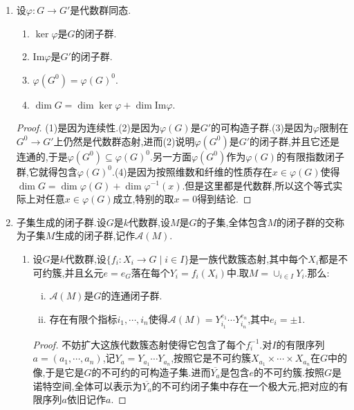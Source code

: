 \begin{enumerate}
\begin{enumerate}[(1)]
\begin{proof}
			从$B\subseteq\mathrm{N}_G(A)$得到$AB$是$G$的子群.并且它作为$A\times B$在$G\times G\to G$下的像,得到$AB$是可构造子集.于是上一条得证.
		\end{proof}
	\end{enumerate}
	\item 设$\varphi:G\to G'$是代数群同态.
	\begin{enumerate}[(1)]
		\item $\ker\varphi$是$G$的闭子群.
		\item $\mathrm{Im}\varphi$是$G'$的闭子群.
		\item $\varphi(G^0)=\varphi(G)^0$.
		\item $\dim G=\dim\ker\varphi+\dim\mathrm{Im}\varphi$.
	\end{enumerate}
    \begin{proof}
    	
    	(1)是因为连续性.(2)是因为$\varphi(G)$是$G'$的可构造子群.(3)是因为$\varphi$限制在$G^0\to G'$上仍然是代数群态射,进而(2)说明$\varphi(G^0)$是$G'$的闭子群,并且它还是连通的,于是$\varphi(G^0)\subseteq\varphi(G)^0$.另一方面$\varphi(G^0)$作为$\varphi(G)$的有限指数闭子群,它就得包含$\varphi(G)^0$.(4)是因为按照维数和纤维的性质存在$x\in\varphi(G)$使得$\dim G=\dim\varphi(G)+\dim\varphi^{-1}(x)$.但是这里都是代数群,所以这个等式实际上对任意$x\in\varphi(G)$成立,特别的取$x=0$得到结论.
    \end{proof}
    \item 子集生成的闭子群.设$G$是$k$代数群,设$M$是$G$的子集,全体包含$M$的闭子群的交称为子集$M$生成的闭子群,记作$\mathscr{A}(M)$.
    \begin{enumerate}[(1)]
    	\item 设$G$是$k$代数群,设$\{f_i:X_i\to G\mid i\in I\}$是一族代数簇态射,其中每个$X_i$都是不可约簇,并且幺元$e=e_G$落在每个$Y_i=f_i(X_i)$中.取$M=\cup_{i\in I}Y_i$.那么:
    	\begin{enumerate}[(i)]
    		\item $\mathscr{A}(M)$是$G$的连通闭子群.
    		\item 存在有限个指标$i_1,\cdots,i_n$使得$\mathscr{A}(M)=Y_{i_1}^{e_1}\cdots Y_{i_n}^{e_n}$,其中$e_i=\pm1$.
    	\end{enumerate}
        \begin{proof}
        	
        	不妨扩大这族代数簇态射使得它包含了每个$f_i^{-1}$.对$I$的有限序列$a=(a_1,\cdots,a_n)$,记$Y_a=Y_{a_1}\cdots Y_{a_n}$,按照它是不可约簇$X_{a_1}\times\cdots\times X_{a_n}$在$G$中的像,于是它是$G$的不可约的可构造子集.进而$\overline{Y_a}$是包含$e$的不可约簇.按照$G$是诺特空间,全体可以表示为$\overline{Y_a}$的不可约闭子集中存在一个极大元,把对应的有限序列$a$依旧记作$a$.
        	

\end{proof}
\end{enumerate}
\end{enumerate}
